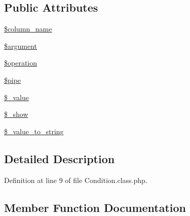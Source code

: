 \subsection*{Public Attributes}
\begin{DoxyCompactItemize}
\item 
\hyperlink{classCondition_ae34f9b605299c7142f5c9daa61b338fe}{\$column\+\_\+name}
\item 
\hyperlink{classCondition_ab2171308c722d4d35f37369762d78175}{\$argument}
\item 
\hyperlink{classCondition_aa8fbf3bdbbea0c57d3822ac585eb75a4}{\$operation}
\item 
\hyperlink{classCondition_a19b2472b462fc19e44b8fcbf1898b9cc}{\$pipe}
\item 
\hyperlink{classCondition_af8fed5d1250eb545d782e80478dac4fe}{\$\+\_\+value}
\item 
\hyperlink{classCondition_ae631b5f7e9a50ca781bd034edaf5e059}{\$\+\_\+show}
\item 
\hyperlink{classCondition_afcfd7fce951a699f3b065e227dbbacc9}{\$\+\_\+value\+\_\+to\+\_\+string}
\end{DoxyCompactItemize}


\subsection{Detailed Description}


Definition at line 9 of file Condition.\+class.\+php.



\subsection{Member Function Documentation}
